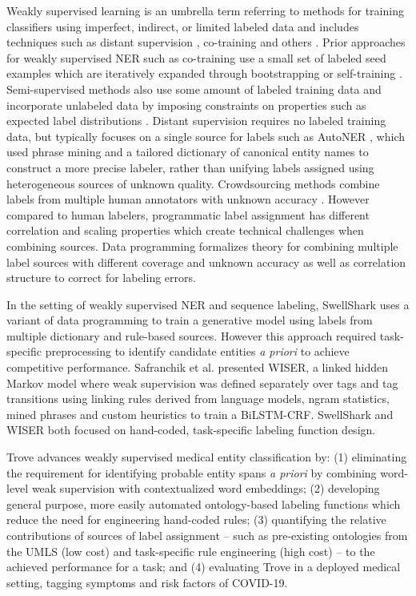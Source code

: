 \documentclass{article}
\begin{document}
Weakly supervised learning is an umbrella term referring to methods for training classifiers using imperfect, indirect, or limited labeled data and includes techniques such as distant supervision \cite{Craven1999-sl,Mintz2009-zs}, co-training \cite{Blum1998-te} and others \cite{Ma2016-rb}.
Prior approaches for weakly supervised NER such as co-training use a small set of labeled seed examples \cite{Collins1999-js} which are iteratively expanded through bootstrapping or self-training \cite{Medlock2007-qt}. Semi-supervised methods also use some amount of labeled training data and incorporate unlabeled data by imposing constraints on properties such as expected label distributions \cite{Mann2010-yd}.
Distant supervision requires no labeled training data, but typically focuses on a single source for labels such as AutoNER \cite{Shang2018-sb}, which used phrase mining and a tailored dictionary of canonical entity names to construct a more precise labeler, rather than unifying labels assigned using heterogeneous sources of unknown quality.
Crowdsourcing methods combine labels from multiple human annotators with unknown accuracy \cite{Khetan2017-vq}.
However compared to human labelers, programmatic label assignment has different correlation and scaling properties which create technical challenges when combining sources. Data programming \cite{Ratner2016-so,Ratner2017-rc,Ratner2019-xo} formalizes theory for combining multiple label sources with different coverage and unknown accuracy as well as correlation structure to correct for labeling errors. 

In the setting of weakly supervised NER and sequence labeling, SwellShark \cite{Fries2017-bh} uses a variant of data programming to train a generative model using labels from multiple dictionary and rule-based sources.
However this approach required task-specific preprocessing to identify candidate entities \emph{a priori} to achieve competitive performance. 
Safranchik et al. \cite{Safranchik2020-no} presented WISER, a linked hidden Markov model where weak supervision was defined separately over tags and tag transitions using linking rules derived from language models, ngram statistics, mined phrases and custom heuristics to train a BiLSTM-CRF. 
SwellShark and WISER both focused on hand-coded, task-specific labeling function design.

Trove advances weakly supervised medical entity classification by: (1) eliminating the requirement for identifying probable entity spans \emph{a priori} by combining word-level weak supervision with contextualized word embeddings; (2) developing general purpose, more easily automated ontology-based labeling functions which reduce the need for engineering hand-coded rules; (3) quantifying the relative contributions of sources of label assignment -- such as pre-existing ontologies from the UMLS (low cost) and task-specific rule engineering (high cost) -- to the achieved performance for a task; and (4) evaluating Trove in a deployed medical setting, tagging symptoms and risk factors of COVID-19.
\end{document}
